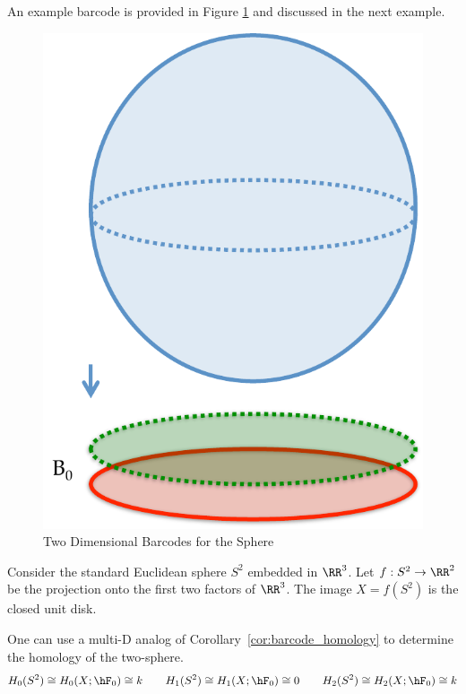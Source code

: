 An example barcode is provided in Figure \ref{fig:sphere2d_bc} and discussed in the next example.

\begin{figure}[ht]
\begin{center}
\includegraphics[width=.7\textwidth]{sphere_2dbc.pdf}
\end{center}
\caption{Two Dimensional Barcodes for the Sphere}
\label{fig:sphere2d_bc}
\end{figure}

\begin{ex}
	Consider the standard Euclidean sphere $S^2$ embedded in $\RR^3$. Let $f:S^2\to\RR^2$ be the projection onto the first two factors of $\RR^3$. The image $X=f(S^2)$ is the closed unit disk.

	One can use a multi-D analog of Corollary~\ref{cor:barcode_homology} to determine the homology of the two-sphere. 
	\[
		H_0(S^2)\cong H_0(X;\hF_0)\cong k \qquad H_1(S^2)\cong H_1(X;\hF_0)\cong 0 \qquad H_2(S^2)\cong H_2(X;\hF_0)\cong k
	\]
\end{ex}
